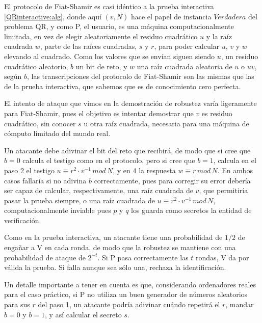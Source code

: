 \hfil


El protocolo de Fiat-Shamir es casi idéntico a la prueba interactiva \ref{QRinteractive:alg}, donde aquí $(v,N)$ hace el papel de instancia $Verdadera$ del problema QR, y como P, el usuario, es una máquina computacionalmente limitada, en vez de elegir aleatoriamente el residuo cuadrático $u$ y la raíz cuadrada $w$, parte de las raíces cuadradas, $s$ y $r$, para poder calcular $u$, $v$ y $w$ elevando al cuadrado. Como los valores que se envían siguen siendo $u$, un residuo cuadrático aleatorio, $b$ un bit de reto, y $w$ una raíz cuadrada aleatoria de $u$ o $uv$, según $b$, las transcripciones del protocolo de Fiat-Shamir son las mismas que las de la prueba interactiva, que sabemos que es de conocimiento cero perfecta.

\hfil

El intento de ataque que vimos en la demostración de robustez varía ligeramente para Fiat-Shamir, pues el objetivo es intentar demostrar que $v$ es residuo cuadrático, sin conocer $s$ u otra raíz cuadrada, necesaria para una máquina de cómputo limitado del mundo real.

Un atacante debe adivinar el bit del reto que recibirá, de modo que si cree que $b=0$ calcula el testigo como en el protocolo, pero si cree que $b=1$, calcula en el paso 2 el testigo $u \equiv r^2\cdot v^{-1} \, mod \, N$, y en 4 la respuesta $w \equiv r \, mod \, N$. En ambos casos fallaría si no adivina $b$ correctamente, pues para corregir su error debería ser capaz de calcular, respectivamente, una raíz cuadrada de $v$, que permitiría pasar la prueba siempre, o una raíz cuadrada de $u \equiv r^2\cdot v^{-1} \, mod \, N$, computacionalmente inviable pues $p$ y $q$ los guarda como secretos la entidad de verificación.

Como en la prueba interactiva, un atacante tiene una probabilidad de $1/2$ de engañar a V en cada ronda, de modo que la robustez se mantiene con una probabilidad de ataque de $2^{-t}$. Si P pasa correctamente las $t$ rondas, V da por válida la prueba. Si falla aunque sea sólo una, rechaza la identificación.

\hfil

Un detalle importante a tener en cuenta es que, considerando ordenadores reales para el caso práctico, si P no utiliza un buen generador de números aleatorios para sus $r$ del paso 1, un atacante podría adivinar cuándo repetirá el $r$, mandar $b=0$ y $b=1$, y así calcular el secreto $s$.




